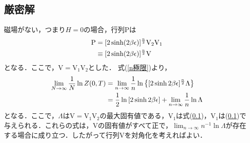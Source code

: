 \documentclass[a4paper,11pt]{jsreport}
\begin{document}
\subsection{厳密解}
磁場がない，つまり$H=0$の場合，行列$\mathrm{P}$は
\begin{align}
  \mathrm{P}
  &= [2 \sinh (2 \beta \epsilon)]^{\frac{n}{2}} \mathrm{V}_2 \mathrm{V}_1 \notag \\
  &\equiv [2 \sinh (2 \beta \epsilon)]^{\frac{n}{2}} \mathrm{V}
  \label{行列P磁場ゼロ}
\end{align}
となる．ここで，$\mathrm{V} = \mathrm{V}_1 \mathrm{V}_2$とした．
式(\ref{n極限})より，
\begin{align}
  \lim_{N \rightarrow \infty} \frac{1}{N} \ln{Z(0, T)} 
  &= \lim_{n \rightarrow \infty} \frac{1}{n} \ln{\left\{[2 \sinh{2 \beta \epsilon}]^{\frac{n}{2}}\Lambda\right\}} \notag \\
  &= \frac{1}{2} \ln{[2 \sinh{2 \beta \epsilon}]}
  + \lim_{n \rightarrow \infty} \frac{1}{n} \ln{\Lambda}
\end{align}
となる．ここで，$\Lambda$は$\mathrm{V} = \mathrm{V}_1 \mathrm{V}_2$の最大固有値である，$\mathrm{V}_1$は式(\ref{})，$\mathrm{V}_1$は(\ref{})で与えられる．これらの式は，$\mathrm{V}$の固有値がすべて正で，$\lim_{n \rightarrow \infty} n^{-1}\ln{\Lambda}$が存在する場合に成り立つ．したがって行列$\mathrm{V}$を対角化を考えればよい．
\end{document}
